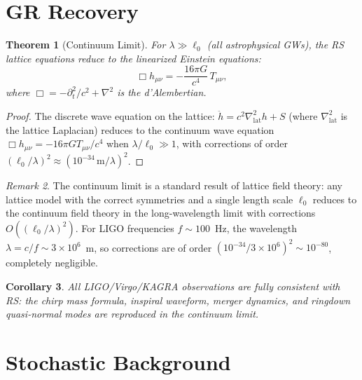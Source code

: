 \documentclass[12pt,a4paper]{article}
\newtheorem{theorem}{Theorem}[section]
\newtheorem{corollary}[theorem]{Corollary}
\theoremstyle{definition}
\theoremstyle{remark}
\newtheorem{remark}[theorem]{Remark}
\begin{document}
\section{GR Recovery}
\label{sec:gr-recovery}

\begin{theorem}[Continuum Limit]
For $\lambda \gg \ell_0$ (all astrophysical GWs), the RS lattice
equations reduce to the linearized Einstein equations:
\begin{equation}
  \Box h_{\mu\nu} = -\frac{16\pi G}{c^4}\,T_{\mu\nu},
\end{equation}
where $\Box = -\partial_t^2/c^2 + \nabla^2$ is the d'Alembertian.
\end{theorem}

\begin{proof}
The discrete wave equation on the lattice:
$\ddot{h} = c^2 \nabla^2_{\mathrm{lat}} h + S$ (where
$\nabla^2_{\mathrm{lat}}$ is the lattice Laplacian) reduces to the
continuum wave equation $\Box h_{\mu\nu} = -16\pi G T_{\mu\nu}/c^4$
when $\lambda/\ell_0 \gg 1$, with corrections of order $(\ell_0/\lambda)^2
\approx (10^{-34}\,\mathrm{m}/\lambda)^2$.
\end{proof}

\begin{remark}
The continuum limit is a standard result of lattice field theory: any
lattice model with the correct symmetries and a single length scale
$\ell_0$ reduces to the continuum field theory in the long-wavelength
limit with corrections $O((\ell_0/\lambda)^2)$.  For LIGO frequencies
$f \sim 100$~Hz, the wavelength $\lambda = c/f \sim 3 \times 10^6$~m,
so corrections are of order $(10^{-34}/3 \times 10^6)^2 \sim 10^{-80}$,
completely negligible.
\end{remark}

\begin{corollary}
All LIGO/Virgo/KAGRA observations are fully consistent with RS: the chirp
mass formula, inspiral waveform, merger dynamics, and ringdown
quasi-normal modes are reproduced in the continuum limit.
\end{corollary}

\section{Stochastic Background}
\label{sec:stochastic}
\end{document}
